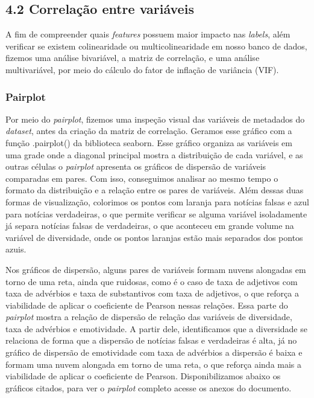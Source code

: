 \documentclass[
  brazilian,
  11pt,
]{article}
\begin{document}
\subsection{4.2 Correlação entre variáveis}\label{correlauxe7uxe3o-entre-variuxe1veis}

A fim de compreender quais \emph{features} possuem maior impacto nas \emph{labels}, além verificar se existem colinearidade ou multicolinearidade em nosso banco de dados, fizemos uma análise bivariável, a matriz de correlação, e uma análise multivariável, por meio do cálculo do fator de inflação de variância (VIF).

\subsubsection{Pairplot}\label{pairplot}

Por meio do \emph{pairplot}, fizemos uma inspeção visual das variáveis de metadados do \emph{dataset}, antes da criação da matriz de correlação. Geramos esse gráfico com a função .pairplot() da biblioteca seaborn. Esse gráfico organiza as variáveis em uma grade onde a diagonal principal mostra a distribuição de cada variável, e as outras células o \emph{pairplot} apresenta os gráficos de dispersão de variáveis comparadas em pares. Com isso, conseguimos analisar ao mesmo tempo o formato da distribuição e a relação entre os pares de variáveis. Além dessas duas formas de visualização, colorimos os pontos com laranja para notícias falsas e azul para notícias verdadeiras, o que permite verificar se alguma variável isoladamente já separa notícias falsas de verdadeiras, o que aconteceu em grande volume na variável de diversidade, onde os pontos laranjas estão mais separados dos pontos azuis.

Nos gráficos de dispersão, alguns pares de variáveis formam nuvens alongadas em torno de uma reta, ainda que ruidosas, como é o caso de taxa de adjetivos com taxa de advérbios e taxa de substantivos com taxa de adjetivos, o que reforça a viabilidade de aplicar o coeficiente de Pearson nessas relações. Essa parte do \emph{pairplot} mostra a relação de dispersão de relação das variáveis de diversidade, taxa de advérbios e emotividade. A partir dele, identificamos que a diversidade se relaciona de forma que a dispersão de notícias falsas e verdadeiras é alta, já no gráfico de dispersão de emotividade com taxa de advérbios a dispersão é baixa e formam uma nuvem alongada em torno de uma reta, o que reforça ainda mais a viabilidade de aplicar o coeficiente de Pearson. Disponibilizamos abaixo os gráficos citados, para ver o \emph{pairplot} completo acesse os anexos do documento.
\end{document}
